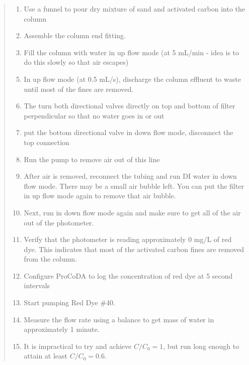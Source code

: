 \documentclass[letterpaper,10pt,english]{sphinxmanual}
\begin{document}
\begin{quote}
\begin{enumerate}
\end{enumerate}
\begin{enumerate}
\item {} 
Use a funnel to pour dry mixture of sand and activated carbon into the column

\item {} 
Assemble the column end fitting.

\item {} 
Fill the column with water in up flow mode (at 5 mL/min - idea is to do this slowly so that air escapes)

\end{enumerate}
\begin{enumerate}
\setcounter{enumi}{4}
\item {} 
In up flow mode (at 0.5 mL/s), discharge the column effluent to waste until most of the fines are removed.

\item {} 
The turn both directional valves directly on top and bottom of filter perpendicular so that no water goes in or out

\item {} 
put the bottom directional valve in down flow mode, disconnect the top connection

\item {} 
Run the pump to remove air out of this line

\item {} 
After air is removed, reconnect the tubing and run DI water in down flow mode. There may be a small air bubble left. You can put the filter in up flow mode again to remove that air bubble.

\item {} 
Next, run in down flow mode again and make sure to get all of the air out of the photometer.

\item {} 
Verify that the photometer is reading approximately 0 mg/L of red dye. This indicates that most of the activated carbon fines are removed from the column.

\item {} 
Configure ProCoDA to log the concentration of red dye at 5 second intervals

\item {} 
Start pumping Red Dye \#40.

\item {} 
Measure the flow rate using a balance to get mass of water in approximately 1 minute.

\item {} 
It is impractical to try and achieve \(C/C_0 = 1\), but run long enough to attain at least \(C/C_0 = 0.6\).

\end{enumerate}
\end{quote}
\end{document}
